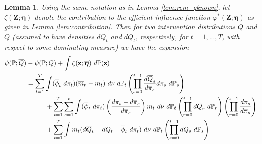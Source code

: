 \documentclass[12pt]{article}
\newcommand{\Pb}{\mathbb{P}}
\newcommand{\bZ}{\mathbf{Z}}
\newcommand{\bz}{\mathbf{z}}
\newtheorem{lemma}{Lemma}
\theoremstyle{remark}
\begin{document}
\begin{lemma}
\label{lem:rem_contribution} 
Using the same notation as in Lemma \ref{lem:rem_qknown}, let $\zeta(\bZ;\boldsymbol{\eta})$ denote the contribution to the efficient influence function $\varphi^*(\bZ;\boldsymbol\eta)$ as given in Lemma \ref{lem:contribution}. Then for two intervention distributions $Q$ and $\overline{Q}$ (assumed to have densities $dQ_t$ and $d\overline{Q}_t$, respectively, for $t=1,...,T$, with respect to some dominating measure)  we have the expansion
\begin{align*}
\psi(\Pb;\overline{Q}) &- \psi(\Pb;Q) + \int  \zeta(\bz;\boldsymbol{\overline\eta}) \ d\Pb(\bz) \\
&= \sum_{t=1}^T \int (\overline\phi_t \ d\pi_t) (\overline{m}_t - m_t) \ d\nu \ d\Pb_t \left( \prod_{s=0}^{t-1}  \frac{ d\overline{Q}_s }{ d\overline\pi_s } d\pi_s \ d\Pb_s \right) \\
& \hspace{.4in} + \sum_{t=1}^T \sum_{s=1}^t \int (\overline\phi_t \ d\pi_t) \left( \frac{d\pi_s-d\overline\pi_s}{d\overline\pi_s} \right)  m_t \ d\nu \ d\Pb_t \left( \prod_{r=0}^{t-1} d\overline{Q}_r \ d\Pb_r \right) \left( \prod_{r=0}^{s-1}  \frac{ d\pi_s }{ d\overline\pi_s } \right) \\
& \hspace{.4in} + \sum_{t=1}^T \int  m_t (d\overline{Q}_t - dQ_t + \overline\phi_t \ d\pi_t) \ d\nu \ d\Pb_t \left( \prod_{s=0}^{t-1} dQ_s  \ d\Pb_s \right)
\end{align*}
\end{lemma}
\end{document}
